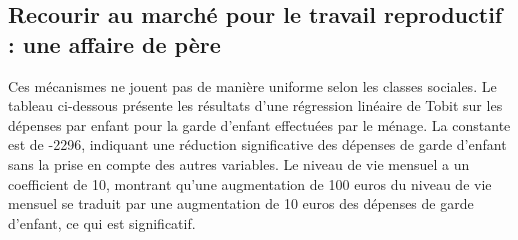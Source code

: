 \documentclass[
  12pt,
]{book}
\begin{document}
\subsection{Recourir au marché pour le travail reproductif : une affaire
de
père}\label{recourir-au-marchuxe9-pour-le-travail-reproductif-une-affaire-de-puxe8re}

Ces mécanismes ne jouent pas de manière uniforme selon les classes
sociales. Le tableau ci-dessous présente les résultats d'une régression
linéaire de Tobit sur les dépenses par enfant pour la garde d'enfant
effectuées par le ménage. La constante est de -2296, indiquant une
réduction significative des dépenses de garde d'enfant sans la prise en
compte des autres variables. Le niveau de vie mensuel a un coefficient
de 10, montrant qu'une augmentation de 100 euros du niveau de vie
mensuel se traduit par une augmentation de 10 euros des dépenses de
garde d'enfant, ce qui est significatif.
\end{document}
